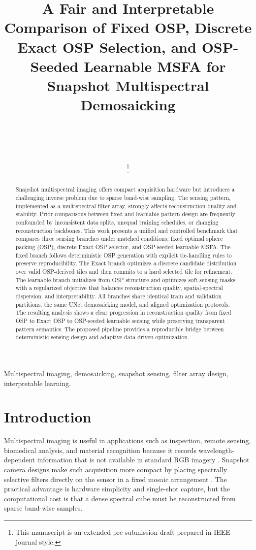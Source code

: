 \documentclass[journal]{IEEEtran}
\title{A Fair and Interpretable Comparison of Fixed OSP, Discrete Exact OSP Selection, and OSP-Seeded Learnable MSFA for Snapshot Multispectral Demosaicking}
\author{
\centering
\begin{minipage}[t]{0.40\textwidth}
  \centering
  \IEEEauthorblockN{Dhruva V}\\
  \IEEEauthorblockA{Indian Institute of Information Technology Vadodara\\
  202351032@iiitvadodara.ac.in}
\end{minipage}
\hspace{0.06\textwidth}
\begin{minipage}[t]{0.40\textwidth}
  \centering
  \IEEEauthorblockN{Ayush Singh}\\
  \IEEEauthorblockA{Indian Institute of Information Technology Vadodara\\
  202351017@iiitvadodara.ac.in}
\end{minipage}
\thanks{This manuscript is an extended pre-submission draft prepared in IEEE journal style.}
}
\begin{document}
\maketitle

\begin{abstract}
Snapshot multispectral imaging offers compact acquisition hardware but introduces a challenging inverse problem due to sparse band-wise sampling. The sensing pattern, implemented as a multispectral filter array, strongly affects reconstruction quality and stability. Prior comparisons between fixed and learnable pattern design are frequently confounded by inconsistent data splits, unequal training schedules, or changing reconstruction backbones. This work presents a unified and controlled benchmark that compares three sensing branches under matched conditions: fixed optimal sphere packing (OSP), discrete Exact OSP selector, and OSP-seeded learnable MSFA. The fixed branch follows deterministic OSP generation with explicit tie-handling rules to preserve reproducibility. The Exact branch optimizes a discrete candidate distribution over valid OSP-derived tiles and then commits to a hard selected tile for refinement. The learnable branch initializes from OSP structure and optimizes soft sensing masks with a regularized objective that balances reconstruction quality, spatial-spectral dispersion, and interpretability. All branches share identical train and validation partitions, the same UNet demosaicking model, and aligned optimization protocols. The resulting analysis shows a clear progression in reconstruction quality from fixed OSP to Exact OSP to OSP-seeded learnable sensing while preserving transparent pattern semantics. The proposed pipeline provides a reproducible bridge between deterministic sensing design and adaptive data-driven optimization.
\end{abstract}

\begin{IEEEkeywords}
Multispectral imaging, demosaicking, snapshot sensing, filter array design, interpretable learning.
\end{IEEEkeywords}

\section{Introduction}
Multispectral imaging is useful in applications such as inspection, remote sensing, biomedical analysis, and material recognition because it records wavelength-dependent information that is not available in standard RGB imagery \cite{ghamisi2017,lu2014,wang2021}. Snapshot camera designs make such acquisition more compact by placing spectrally selective filters directly on the sensor in a fixed mosaic arrangement \cite{bayer1976,miao2006,geelen2014}. The practical advantage is hardware simplicity and single-shot capture, but the computational cost is that a dense spectral cube must be reconstructed from sparse band-wise samples.
\end{document}

